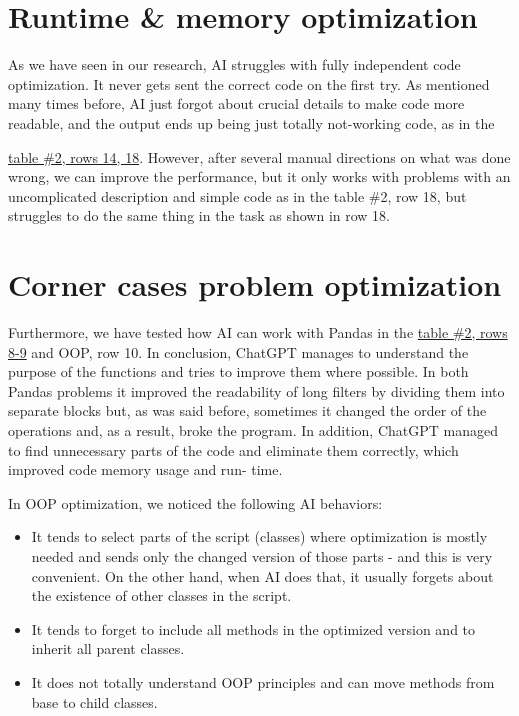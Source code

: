 \documentclass[12pt]{report}
\begin{document}
	\section{Runtime \& memory optimization}


		As we have seen in our research, AI struggles with fully independent code optimization. It never gets sent the correct code on the first try. As mentioned many times
		before, AI just forgot about crucial details to make code more readable, and the
		output ends up being just totally not-working code, as in the

		\href{https://docs.google.com/spreadsheets/d/1qXPyAJsOOpmtxIoGqObwG5mTaLU3IWO0SQRGbjZPhEc/edit#gid=0}{table \#2, rows 14, 18}. However, after several manual directions on what was done wrong, we can improve the
		performance, but it only works with problems with an uncomplicated description and
		simple code as in the table \#2, row 18, but struggles to do
		the same thing in the task as shown in row 18.


	\section{Corner cases problem optimization}

			Furthermore, we have tested how AI can work with Pandas in the \href{https://docs.google.com/spreadsheets/d/1qXPyAJsOOpmtxIoGqObwG5mTaLU3IWO0SQRGbjZPhEc/edit#gid=0}{table \#2, rows 8-9} and OOP, row 10. In conclusion, ChatGPT manages to understand the purpose of
			the functions and tries to improve them where possible. In both Pandas problems
			it improved the readability of long filters by dividing them into separate blocks but,
			as was said before, sometimes it changed the order of the operations and, as a result, broke the program. In addition, ChatGPT managed to find unnecessary parts of the code and
			eliminate them correctly, which improved code memory usage and run-
			time.

			In OOP optimization, we noticed the following AI behaviors:

			\begin{itemize}
				\item It tends to select parts of the script (classes) where optimization is mostly
				needed and sends only the changed version of those parts - and this is very
				convenient. On the other hand, when AI does that, it usually forgets about the
				existence of other classes in the script.
				\item It tends to forget to include all methods in the optimized version and
				to inherit all parent classes.
				\item It does not totally understand OOP principles and can move methods
				from base to child classes.
			\end{itemize}
\end{document}
